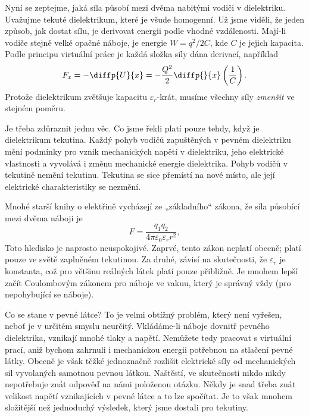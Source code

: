     Nyní se zeptejme, jaká síla působí mezi dvěma nabitými vodiči v dielektriku. Uvažujme tekuté
    dielektrikum, které je všude homogenní. Už jsme viděli, že jeden způsob, jak dostat sílu, je
    derivovat energii podle vhodné vzdálenosti. Mají-li vodiče stejně velké opačné náboje, je
    energie \(W= q^2/2C\), kde \(C\) je jejich kapacita. Podle principu virtuální práce je každá
    složka síly dána derivací, například
    \begin{equation}\label{fyz:eq934}
      F_x=-\diffp{U}{x}=-\frac{Q^2}{2}\diffp{}{x}\left(\dfrac{1}{C}\right).
    \end{equation}
    Protože dielektrikum zvětšuje kapacitu \(\varepsilon_r\)-krát, musíme všechny síly
    \emph{zmenšit} ve stejném poměru.

    Je třeba zdůraznit jednu věc. Co jsme řekli platí pouze tehdy, když je dielektrikum tekutina.
    Každý pohyb vodičů zapuštěných v pevném dielektriku mění podmínky pro vznik mechanických napětí
    v dielektriku, jeho elektrické vlastnosti a vyvolává i změnu mechanické energie dielektrika.
    Pohyb vodičů v tekutině nemění tekutinu. Tekutina se sice přemístí na nové místo, ale její
    elektrické charakteristiky se nezmění.
      
    Mnohé starší knihy o elektřině vycházejí ze „základního“ zákona, že síla působící mezi dvěma
    náboji je
    \begin{equation}\label{fyz:eq935}
      F=\dfrac{q_1q_2}{4\pi\varepsilon_0\varepsilon_r r^2},
    \end{equation}
    Toto hledisko je naprosto neuspokojivé. Zaprvé, tento zákon neplatí obecně; platí pouze ve světě
    zaplněném tekutinou. Za druhé, závisí na skutečnosti, že \(\varepsilon_r\) je konstanta, což pro
    většinu reálných látek platí pouze přibližně. Je mnohem lepší začít Coulombovým zákonem pro
    náboje ve vakuu, který je správný vždy (pro nepohybující se náboje).

    Co se stane v pevné látce? To je velmi obtížný problém, který není vyřešen, neboť je v určitém
    smyslu neurčitý. Vkládáme-li náboje dovnitř pevného dielektrika, vznikají mnohé tlaky a napětí.
    Nemůžete tedy pracovat s virtuální prací, aniž bychom zahrnuli i mechanickou energii potřebnou
    na stlačení pevné látky. Obecně je však těžké jednoznačně rozlišit elektrické síly od
    mechanických sil vyvolaných samotnou pevnou látkou. Naštěstí, ve skutečnosti nikdo nikdy
    nepotřebuje znát odpověď na námi položenou otázku. Někdy je snad třeba znát velikost napětí
    vznikajících v pevné látce a to lze spočítat. Je to však mnohem složitější než jednoduchý
    výsledek, který jsme dostali pro tekutiny.

